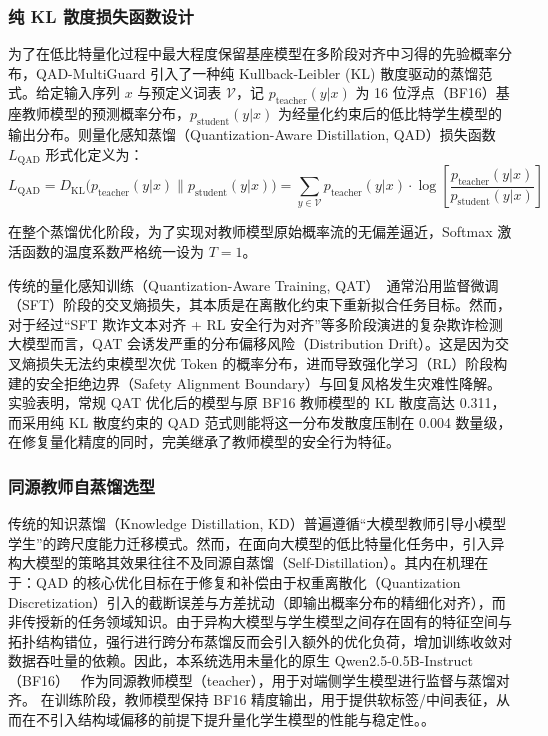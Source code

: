 \documentclass[11pt, a4paper]{article}
\begin{document}
\subsubsection{纯 KL 散度损失函数设计}

为了在低比特量化过程中最大程度保留基座模型在多阶段对齐中习得的先验概率分布，QAD-MultiGuard 引入了一种纯 Kullback-Leibler (KL) 散度驱动的蒸馏范式。给定输入序列 $x$ 与预定义词表 $\mathcal{V}$，记 $p_{\text{teacher}}(y|x)$ 为 16 位浮点（BF16）基座教师模型的预测概率分布，$p_{\text{student}}(y|x)$ 为经量化约束后的低比特学生模型的输出分布。则量化感知蒸馏（Quantization-Aware Distillation, QAD）损失函数 $L_{\text{QAD}}$ 形式化定义为：
\begin{equation}
    L_{\text{QAD}} = D_{\text{KL}}\big( p_{\text{teacher}}(y|x) \parallel p_{\text{student}}(y|x) \big) = \sum_{y \in \mathcal{V}} p_{\text{teacher}}(y|x) \cdot \log \left[ \frac{p_{\text{teacher}}(y|x)}{p_{\text{student}}(y|x)} \right]
\end{equation}

在整个蒸馏优化阶段，为了实现对教师模型原始概率流的无偏差逼近，Softmax 激活函数的温度系数严格统一设为 $T = 1$。

传统的量化感知训练（Quantization-Aware Training, QAT）~\cite{24,25,26}通常沿用监督微调（SFT）阶段的交叉熵损失，其本质是在离散化约束下重新拟合任务目标。然而，对于经过“SFT 欺诈文本对齐 + RL 安全行为对齐”等多阶段演进的复杂欺诈检测大模型而言，QAT 会诱发严重的分布偏移风险（Distribution Drift）。这是因为交叉熵损失无法约束模型次优 Token 的概率分布，进而导致强化学习（RL）阶段构建的安全拒绝边界（Safety Alignment Boundary）与回复风格发生灾难性降解。实验表明，常规 QAT 优化后的模型与原 BF16 教师模型的 KL 散度高达 0.311，而采用纯 KL 散度约束的 QAD 范式则能将这一分布发散度压制在 0.004 数量级，在修复量化精度的同时，完美继承了教师模型的安全行为特征。

\subsubsection{同源教师自蒸馏选型}

传统的知识蒸馏（Knowledge Distillation, KD）普遍遵循“大模型教师引导小模型学生”的跨尺度能力迁移模式。然而，在面向大模型的低比特量化任务中，引入异构大模型的策略其效果往往不及同源自蒸馏（Self-Distillation）。其内在机理在于：QAD 的核心优化目标在于修复和补偿由于权重离散化（Quantization Discretization）引入的截断误差与方差扰动（即输出概率分布的精细化对齐），而非传授新的任务领域知识。由于异构大模型与学生模型之间存在固有的特征空间与拓扑结构错位，强行进行跨分布蒸馏反而会引入额外的优化负荷，增加训练收敛对数据吞吐量的依赖。因此，本系统选用未量化的原生 Qwen2.5-0.5B-Instruct（BF16）~\cite{27,28,29} 作为同源教师模型（teacher），用于对端侧学生模型进行监督与蒸馏对齐。
在训练阶段，教师模型保持 BF16 精度输出，用于提供软标签/中间表征，从而在不引入结构域偏移的前提下提升量化学生模型的性能与稳定性。。
\end{document}

